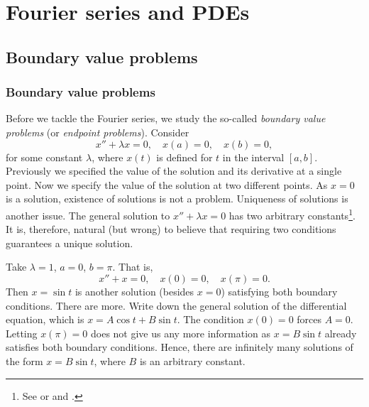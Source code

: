 \chapter{Fourier series and PDEs} \label{FS:chapter}


\section{Boundary value problems} \label{bvp:section}



\subsection{Boundary value problems}

Before we tackle the Fourier series, we study
the so-called 
\emph{boundary value problems}
(or \emph{endpoint problems}).  Consider
\begin{equation*}
x'' + \lambda x = 0, \quad x(a) = 0, \quad x(b) = 0,
\end{equation*}
for some constant $\lambda$, where $x(t)$ is defined for $t$ in the interval
$[a,b]$.
Previously we specified the value of the solution and its derivative
at a single point.  Now we specify the value of the solution at two different
points.  As $x=0$ is a solution, existence of
solutions is not a problem.  Uniqueness of solutions is another issue.
The general solution to $x'' + \lambda x = 0$ has two
arbitrary constants\footnote{%
See  or  and
.}.
It is, therefore,
natural (but wrong) to believe that requiring two
conditions guarantees a unique solution.

\begin{example}
Take $\lambda = 1$,
$a=0$, $b=\pi$.  That is,
\begin{equation*}
x'' + x = 0, \quad x(0) = 0, \quad x(\pi) = 0.
\end{equation*}
Then $x = \sin t$ is another solution (besides $x=0$) satisfying both boundary
conditions.  There are more.  Write down the general
solution of the differential equation, which is $x= A \cos t + B \sin t$.
The condition $x(0) = 0$ forces $A=0$.  Letting $x(\pi) = 0$ does not
give us any more information as $x = B \sin t$ already satisfies both
boundary conditions.
Hence, there are infinitely many solutions of the form $x = B \sin t$,
where $B$ is an arbitrary constant.
\end{example}

